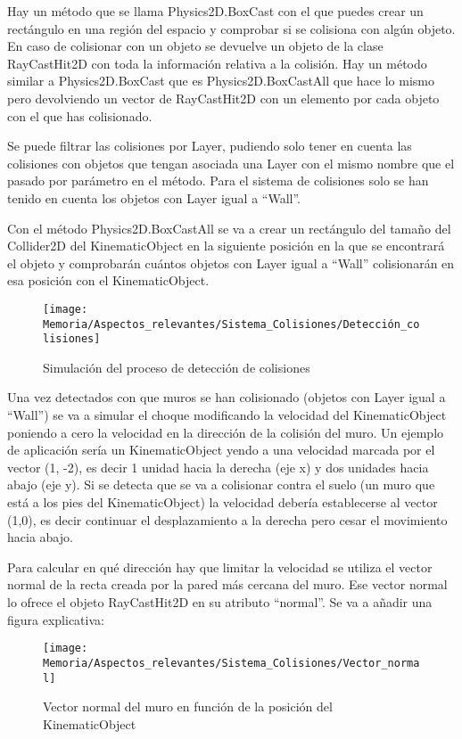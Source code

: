 Hay un método que se llama Physics2D.BoxCast con el que puedes crear un rectángulo en una región del espacio y comprobar si se colisiona con algún objeto. En caso de colisionar con un objeto se devuelve un objeto de la clase RayCastHit2D con toda la información relativa a la colisión. Hay un método similar a Physics2D.BoxCast que es Physics2D.BoxCastAll que hace lo mismo pero devolviendo un vector de RayCastHit2D con un elemento por cada objeto con el que has colisionado.

Se puede filtrar las colisiones por Layer, pudiendo solo tener en cuenta las colisiones con objetos que tengan asociada una Layer con el mismo nombre que el pasado por parámetro en el método. Para el sistema de colisiones solo se han tenido en cuenta los objetos con Layer igual a “Wall”.

Con el método Physics2D.BoxCastAll se va a crear un rectángulo del tamaño del Collider2D del KinematicObject en la siguiente posición en la que se encontrará el objeto y comprobarán cuántos objetos con Layer igual a “Wall” colisionarán en esa posición con el KinematicObject.

\clearpage
\begin{figure}[h]
\centering
\texttt{[image: Memoria/Aspectos\_relevantes/Sistema\_Colisiones/Detección\_colisiones]}
\caption{Simulación del proceso de detección de colisiones}
\end{figure}


Una vez detectados con que muros se han colisionado (objetos con Layer igual a “Wall”) se va a simular el choque modificando la velocidad del KinematicObject poniendo a cero la velocidad en la dirección de la colisión del muro. Un ejemplo de aplicación sería un KinematicObject yendo a una velocidad marcada por el vector (1, -2), es decir 1 unidad hacia la derecha (eje x) y dos unidades hacia abajo (eje y). Si se detecta que se va a colisionar contra el suelo (un muro que está a los pies del KinematicObject) la velocidad debería establecerse al vector (1,0), es decir continuar el desplazamiento a la derecha pero cesar el movimiento hacia abajo.

Para calcular en qué dirección hay que limitar la velocidad se utiliza el vector normal de la recta creada por la pared más cercana del muro. Ese vector normal lo ofrece el objeto RayCastHit2D en su atributo “normal”.
Se va a añadir una figura explicativa:

\clearpage
\begin{figure}[h]
\centering
\texttt{[image: Memoria/Aspectos\_relevantes/Sistema\_Colisiones/Vector\_normal]}
\caption{Vector normal del muro en función de la posición del KinematicObject}
\end{figure}

